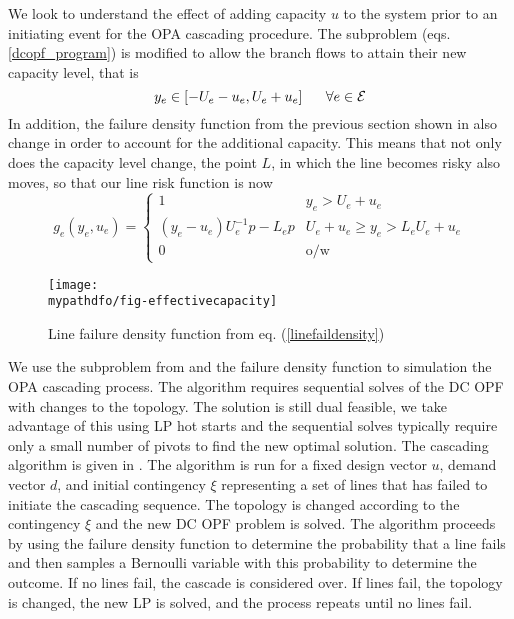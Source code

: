 We look to understand the effect of adding capacity $u$ to the system prior to an initiating event for the OPA cascading procedure.  The subproblem (eqs. \ref{dcopf_program}) is modified to allow the branch flows to attain their new capacity level, that is
\begin{equation}
 y_e  \in \left[ - U_e - u_e, U_e + u_e \right]    \hspace{15px} \forall e \in \cE
\end{equation}
In addition, the failure density function from the previous section shown in  also change in order to account for the additional capacity.  This means that not only does the capacity level change, the point $L$, in which the line becomes risky also moves, so that our line risk function is now
\begin{equation}\label{linefaildensity}
g_e(y_e,u_e) = \left\{ \begin{array}{ll}
1 & y_e > U_e + u_e \\
(y_e-u_e)U_e^{-1}p - L_e p & U_e + u_e \geq y_e > L_e U_e + u_e \\
0 & \mbox{o/w}
\end{array}
\right. 
\end{equation}

\begin{figure}
\centering
\texttt{[image: \\mypathdfo/fig-effectivecapacity]}
\caption{ Line failure density function from eq. (\ref{linefaildensity}) }
\label{cdf}
\end{figure}


We use the subproblem from  and the failure density function to simulation the OPA cascading process.  The algorithm requires sequential solves of the DC OPF with changes to the topology. The solution is still dual feasible, we take advantage of this using LP hot starts and the sequential solves typically  require only a small number of pivots to find the new optimal solution.  The cascading algorithm is given in .  The algorithm is run for a fixed design vector $u$, demand vector $d$, and initial contingency $\xi$ representing a set of lines that has failed to initiate the cascading sequence.  The topology is changed according to the contingency $\xi$ and the new DC OPF problem is solved.  The algorithm proceeds by using the failure density function to determine the probability that a line fails and then samples a Bernoulli variable with this probability to determine the outcome.  If no lines fail, the cascade is considered over.  If lines fail, the topology is changed, the new LP is solved, and the process repeats until no lines fail.

